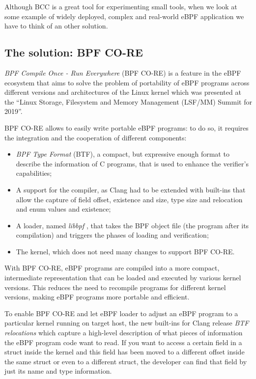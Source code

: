 Although BCC is a great tool for experimenting small tools, when we look at some example of widely deployed, complex and real-world eBPF application we have to think of an other solution.

\subsection{The solution: BPF CO-RE}

\textit{BPF Compile Once - Run Everywhere} (BPF CO-RE) is a feature in the eBPF ecosystem that aims to solve the problem of portability of eBPF programs across different versions and architectures of the Linux kernel which was presented at the ``Linux Storage, Filesystem and Memory Management (LSF/MM) Summit for 2019''.

BPF CO-RE allows to easily write portable eBPF programs: to do so, it requires the integration and the cooperation of different components:

\begin{itemize}
	\item \textit{BPF Type Format} (BTF), a compact, but expressive enough format to
		describe the information of C programs, that is used to enhance the verifier's capabilities;
	\item A support for the compiler, as Clang  had to be extended with built-ins that
		allow the capture of field offset, existence and size, type size and relocation and enum values and existence;
	\item A loader, named \textit{libbpf} \cite{libbpfGitHub}, that takes the BPF
		object file (the program after its compilation) and triggers the phases of loading and verification;
	\item The kernel, which does not need many changes to support BPF CO-RE.
\end{itemize}

With BPF CO-RE, eBPF programs are compiled into a more compact, intermediate representation that can be loaded and executed by various kernel versions.
This reduces the need to recompile programs for different kernel versions, making eBPF programs more portable and efficient. 

To enable BPF CO-RE and let eBPF loader to adjust an eBPF program to a particular kernel running on target host, the new built-ins for Clang release \textit{BTF relocations} which capture a high-level description of what pieces of information the eBPF program code want to read.
If you want to access a certain field in a struct inside the kernel and this field has been moved to a different offset inside the same struct or even to a different struct, the developer can find that field by just its name and type information.

